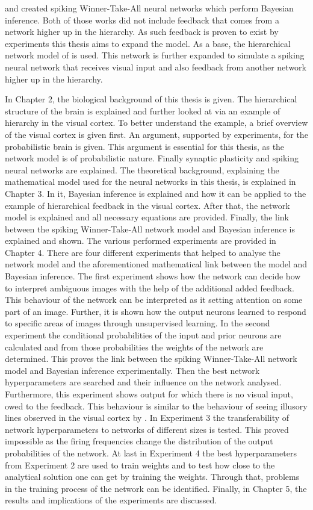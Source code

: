 \citet{nessler} and \citet{nesslerClone} created spiking Winner-Take-All  neural networks which perform Bayesian inference. Both of those works did not include feedback that comes from a network higher up in the hierarchy. As such feedback is proven to exist by experiments this thesis aims to expand the model. As a base, the hierarchical network model of \citet{nessler} is used. This network is further expanded to simulate a spiking neural network that receives visual input and also feedback from another network higher up in the hierarchy.

In Chapter 2, the biological background of this thesis is given. The hierarchical structure of the brain is explained and further looked at via an example of hierarchy in the visual cortex. To better understand the example, a brief overview of the visual cortex is given first. An argument, supported by experiments, for the probabilistic brain is given. This argument is essential for this thesis, as the network model is of probabilistic nature. Finally synaptic plasticity and spiking neural networks are explained.
The theoretical background, explaining the mathematical model used for the neural networks in this thesis, is explained in Chapter 3. In it, Bayesian inference is explained and how it can be applied to the example of hierarchical feedback in the visual cortex. After that, the network model  is explained and all necessary equations are provided. Finally, the link between the spiking Winner-Take-All network model and Bayesian inference is explained and shown.
The various performed experiments are provided in Chapter 4. There are four different experiments that helped to analyse the network model and the aforementioned mathematical link between the model and Bayesian inference. The first experiment shows how the network can decide how to interpret ambiguous images with the help of the additional added feedback. This behaviour of the network can be interpreted as it setting attention on some part of an image. Further, it is shown how the output neurons learned to respond to specific areas of images through unsupervised learning. In the second experiment the conditional probabilities of the input and prior neurons are calculated and from those probabilities the weights of the network are determined. This proves the link between the spiking Winner-Take-All network model and Bayesian inference experimentally. Then the best network hyperparameters are searched and their influence on the network analysed. Furthermore, this experiment shows output for which there is no visual input, owed to the feedback. This behaviour is similar to the behaviour of seeing illusory lines observed in the visual cortex by \citet{HierachicalBayesVisualCortex}. In Experiment 3 the transferability of network hyperparameters to networks of different sizes is tested. This proved impossible as the firing frequencies change the distribution of the output probabilities of the network. At last in Experiment 4 the best hyperparameters from Experiment 2 are used to train weights and to test how close to the analytical solution one can get by training the weights. Through that, problems in the training process of the network can be identified.
Finally, in Chapter 5, the results and implications of the experiments are discussed.